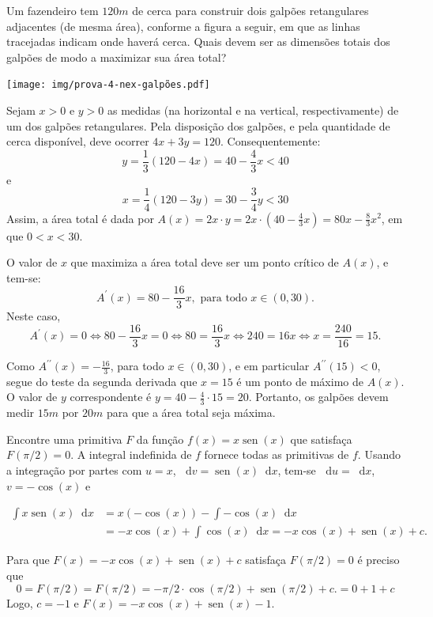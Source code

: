 \documentclass[12pt,a4paper]{article}
\newcommand*\diff{\mathop{}\!\mathrm{d}}
\newcommand*\sen{\operatorname{sen}}
\begin{document}
\begin{ExerciseList}
\Exercise[title={2,0}] Um fazendeiro tem $120m$ de cerca para construir dois galpões retangulares adjacentes (de mesma área), conforme a figura a seguir, em que as linhas tracejadas indicam onde haverá cerca. Quais devem ser as dimensões totais dos galpões de modo a maximizar sua área total?

\begin{center}
    \texttt{[image: img/prova-4-nex-galpões.pdf]}
\end{center}

\Answer Sejam $x > 0$ e $y > 0$ as medidas (na horizontal e na vertical, respectivamente) de um dos galpões retangulares.
Pela disposição dos galpões, e pela quantidade de cerca disponível, deve ocorrer $4x + 3y = 120$. Consequentemente:
\[
    y = \frac{1}{3}(120 - 4x) = 40 - \frac{4}{3}x < 40
\]
e
\[
    x = \frac{1}{4}(120 - 3y) = 30 - \frac{3}{4}y < 30
\]
Assim, a área total é dada por $A(x) = 2x\cdot y = 2x \cdot (40 - \frac{4}{3}x) = 80x - \frac{8}{3}x^2$, em que $0 < x < 30$.

O valor de $x$ que maximiza a área total deve ser um ponto crítico de $A(x)$, e tem-se:
\[
    A^\prime(x) = 80 -\frac{16}{3}x, \text{ para todo } x \in (0, 30).
\]
Neste caso,
\[
    A^\prime(x) = 0
    \Leftrightarrow
    80 -\frac{16}{3}x = 0
    \Leftrightarrow
    80 = \frac{16}{3}x
    \Leftrightarrow
    240 = 16x
    \Leftrightarrow
    x = \frac{240}{16} = 15.
\]

Como $A^{\prime\prime}(x) = -\frac{16}{3}$, para todo $x \in (0, 30)$, e em particular $A^{\prime\prime}(15) < 0$, segue do teste da segunda derivada que $x = 15$ é um ponto de máximo de $A(x)$. O valor de $y$ correspondente é $y = 40 - \frac{4}{3} \cdot 15 = 20$. Portanto, os galpões devem medir $15m$ por $20m$ para que a área total seja máxima.

\Exercise[title={2,0}] Encontre uma primitiva $F$ da função $f(x) = x \sen(x)$ que satisfaça $F(\pi/2) = 0$.
\Answer A integral indefinida de $f$ fornece todas as primitivas de $f$. Usando a integração por partes com $u = x$, $\diff{v} = \sen(x) \diff{x}$, tem-se $\diff{u} = \diff{x}$, $v = -\cos(x)$ e

\begin{align*}
    \int x \sen(x) \diff{x}
    & = x (-\cos(x)) - \int -\cos(x) \diff{x} \\
    & = - x \cos(x) + \int \cos(x) \diff{x}
      = - x \cos(x) + \sen(x) + c.
\end{align*}

Para que $F(x) = - x \cos(x) + \sen(x) + c$ satisfaça $F(\pi/2) = 0$ é preciso que
\[
0
= F(\pi/2)
= F(\pi/2)
= - \pi/2\cdot \cos(\pi/2) + \sen(\pi/2) + c.
= 0 + 1 + c
\]
Logo, $c = -1$ e $F(x) = - x \cos(x) + \sen(x) -1$.


\end{ExerciseList}
\end{document}
